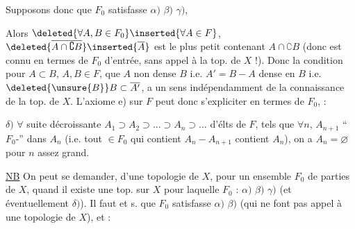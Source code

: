 
Supposons donc que $F_0$ satisfasse $\alpha)$ $\beta)$ $\gamma)$, 

Alors $\deleted{\forall A,B\in F_0}\inserted{\forall A\in F}$, $\deleted{\overline{A\cap\complement B}}\inserted{\overline A}$ est le plus petit  contenant $A\cap\complement B$ (donc est connu en termes de $F_0$ d'entrée, sans appel à la top. de $X$ !). Donc la  condition pour $A\subset B$, $A,B\in F$, que $A$ non dense $B$ i.e. $A'=B-A$ dense en $B$ i.e. $\deleted{\unsure{B}}B\subset\overline{A'}$, a un sens indépendamment de la connaissance de la top. de $X$. L'axiome e) sur $F$ peut donc s'expliciter en termes de $F_0$,  :

$\delta)$ $\forall$ suite décroissante $A_1\supset A_2\supset\ldots\supset A_n\supset\ldots$ d'élts de $F$, tels que $\forall n$, $A_{n+1}$  ``$F_0$-'' dans $A_n$ (i.e.  tout $\in F_0$ qui contient $A_n-A_{n+1}$ contient $A_n$), on a $A_n=\varnothing$ pour $n$ assez grand.

\uline{NB} On peut se demander,  d'une topologie de $X$, pour un ensemble $F_0$ de parties de $X$, quand il existe une top. sur $X$ pour laquelle $F_0$  : $\alpha)$ $\beta)$ $\gamma)$ (et éventuellement $\delta)$). Il faut et s. que $F_0$ satisfasse $\alpha)$ $\beta)$ (qui ne font pas appel à une topologie de $X$), et :

